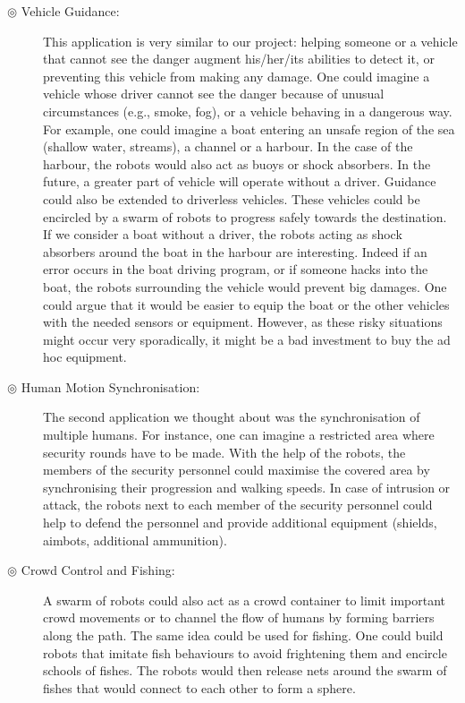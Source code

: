 \documentclass[oneside, a4paper, 12pt]{memoir}
\begin{document}
			\begin{description}
				\item[$\circledcirc$ Vehicle Guidance:] This application is very similar to our project: helping someone or a vehicle that cannot see the danger augment his/her/its abilities to detect it, or preventing this vehicle from making any damage. One could imagine a vehicle whose driver cannot see the danger because of unusual circumstances (e.g., smoke, fog), or a vehicle behaving in a dangerous way. For example, one could imagine a boat entering an unsafe region of the sea (shallow water, streams), a channel or a harbour. In the case of the harbour, the robots would also act as buoys or shock absorbers. In the future, a greater part of vehicle will operate without a driver. Guidance could also be extended to driverless vehicles. These vehicles could be encircled by a swarm of robots to progress safely towards the destination. If we consider a boat without a driver, the robots acting as shock absorbers around the boat in the harbour are interesting. Indeed if an error occurs in the boat driving program, or if someone hacks into the boat, the robots surrounding the vehicle would prevent big damages. One could argue that it would be easier to equip the boat or the other vehicles with the needed sensors or equipment. However, as these risky situations might occur very sporadically, it might be a bad investment to buy the ad hoc equipment.
				
				\item[$\circledcirc$ Human Motion Synchronisation:] The second application we thought about was the synchronisation of multiple humans. For instance, one can imagine a restricted area where security rounds have to be made. With the help of the robots, the members of the security personnel could maximise the covered area by synchronising their progression and walking speeds. In case of intrusion or attack, the robots next to each member of the security personnel could help to defend the personnel and provide additional equipment (shields, aimbots, additional ammunition).
				
				\item[$\circledcirc$ Crowd Control and Fishing:] A swarm of robots could also act as a crowd container to limit important crowd movements or to channel the flow of humans by forming barriers along the path. The same idea could be used for fishing. One could build robots that imitate fish behaviours to avoid frightening them and encircle schools of fishes. The robots would then release nets around the swarm of fishes that would connect to each other to form a sphere.
			\end{description}
			
\end{document}

